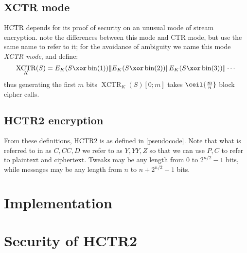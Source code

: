 \documentclass[letterpaper,11pt]{article}
\newcommand*{\Concat}{\Vert}
\DeclareMathOperator{\XCTR}{XCTR}
\DeclareMathOperator{\fromint}{bin}
\begin{document}
\subsection{XCTR mode}

HCTR depends for its proof of security
on an unusual mode of stream encryption.
\cite{hctr,hctr2} note the differences between this mode and CTR mode,
but use the same name to refer to it; for the avoidance of ambiguity
we name this mode \emph{XCTR mode}, and define:
\begin{displaymath}
    \XCTR_K(S) = E_K(S \xor \fromint(1)) \Concat E_K(S \xor \fromint(2)) \Concat E_K(S \xor \fromint(3)) \Concat \cdots
\end{displaymath}
thus generating the first \(m\) bits \(\XCTR_K(S)[0; m]\) takes \(\ceil{\frac{m}{n}}\) block cipher calls.

\subsection{HCTR2 encryption}

From these definitions, HCTR2 is as defined in \autoref{pseudocode}.
Note that what is referred to in \cite{hctr,hctr2} as \(C, \mathit{CC}, D\)
we refer to as \(Y, YY, Z\)
so that we can use \(P, C\) to refer to plaintext and ciphertext.
Tweaks may be any length from 0 to \(2^{n/2}-1\) bits, while
messages may be any length from \(n\) to \(n + 2^{n/2}-1\) bits.

\section{Implementation}


\section{Security of HCTR2}
\end{document}
